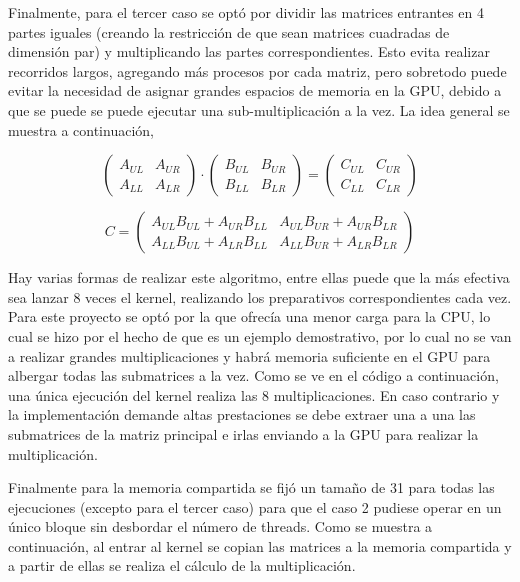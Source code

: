 \documentclass{article}
\begin{document}
Finalmente, para el tercer caso se optó por dividir las matrices entrantes en 4 partes iguales (creando la restricción de que sean matrices cuadradas de dimensión par) y multiplicando las partes correspondientes. Esto evita realizar recorridos largos, agregando más procesos por cada matriz, pero sobretodo puede evitar la necesidad de asignar grandes espacios de memoria en la GPU, debido a que se puede se puede ejecutar una sub-multiplicación a la vez. La idea general se muestra a continuación, 

\[ \begin{pmatrix} A_{UL}&A_{UR}\\A_{LL}&A_{LR}\end{pmatrix}\cdot\begin{pmatrix} B_{UL}&B_{UR}\\B_{LL}&B_{LR}\end{pmatrix}= \begin{pmatrix} C_{UL}&C_{UR}\\C_{LL}&C_{LR}\end{pmatrix} \]

\[ C=\begin{pmatrix} A_{UL}B_{UL}+A_{UR}B_{LL}& A_{UL}B_{UR}+A_{UR}B_{LR} \\A_{LL}B_{UL}+A_{LR}B_{LL}&A_{LL}B_{UR}+A_{LR}B_{LR}\end{pmatrix}  \]

Hay varias formas de realizar este algoritmo, entre ellas puede que la más efectiva sea lanzar 8 veces el kernel, realizando los preparativos correspondientes cada vez. Para este proyecto se optó por la que ofrecía una menor carga para la CPU, lo cual se hizo por el hecho de que es un ejemplo demostrativo, por lo cual no se van a realizar grandes multiplicaciones y habrá memoria suficiente en el GPU para albergar todas las submatrices a la vez. Como se ve en el código a continuación, una única ejecución del kernel realiza las 8 multiplicaciones. En caso contrario y la implementación demande altas prestaciones se debe extraer una a una las submatrices de la matriz principal e irlas enviando a la GPU para realizar la multiplicación. 


Finalmente para la memoria compartida se fijó un tamaño de 31 para todas las ejecuciones (excepto para el tercer caso) para que el caso 2 pudiese operar en un único bloque sin desbordar el número de threads. Como se muestra a continuación, al entrar al kernel se copian las matrices a la memoria compartida y a partir de ellas se realiza el cálculo de la multiplicación.
\end{document}
